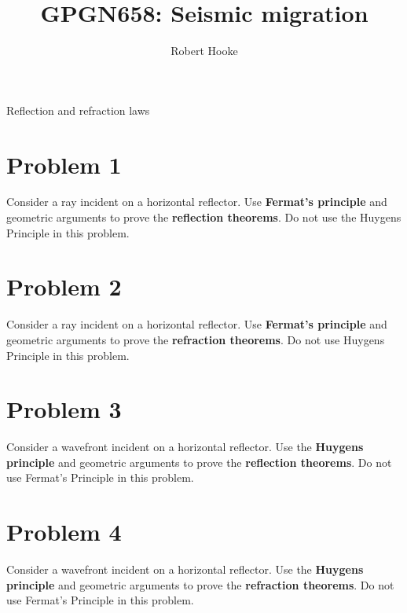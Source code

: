 \author{Robert Hooke}
\title{GPGN658: Seismic migration}{Reflection and refraction laws}

\section{Problem 1}
Consider a ray incident on a horizontal reflector. Use
\textbf{Fermat's principle} and geometric arguments to prove the
\textbf{reflection theorems}. Do not use the Huygens Principle in this
problem.

\section{Problem 2}
Consider a ray incident on a horizontal reflector. Use
\textbf{Fermat's principle} and geometric arguments to prove the 
\textbf{refraction theorems}. Do not use Huygens Principle in this problem.

\section{Problem 3}
Consider a wavefront incident on a horizontal reflector. Use the
\textbf{Huygens principle} and geometric arguments to prove the 
\textbf{reflection theorems}. Do not use Fermat's Principle in this problem.

\section{Problem 4}
Consider a wavefront incident on a horizontal reflector. Use the
\textbf{Huygens principle} and geometric arguments to prove the
\textbf{refraction theorems}. Do not use Fermat's Principle in this
problem.
